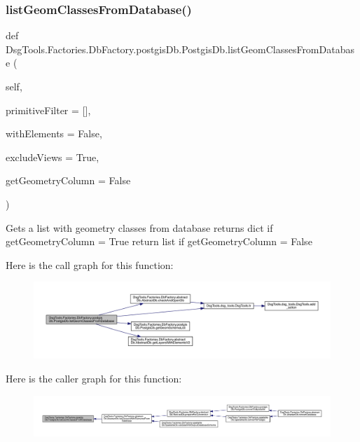 \subsubsection{\texorpdfstring{list\+Geom\+Classes\+From\+Database()}{listGeomClassesFromDatabase()}}
{\footnotesize\ttfamily def Dsg\+Tools.\+Factories.\+Db\+Factory.\+postgis\+Db.\+Postgis\+Db.\+list\+Geom\+Classes\+From\+Database (\begin{DoxyParamCaption}\item[{}]{self,  }\item[{}]{primitive\+Filter = {\ttfamily \mbox{[}\mbox{]}},  }\item[{}]{with\+Elements = {\ttfamily False},  }\item[{}]{exclude\+Views = {\ttfamily True},  }\item[{}]{get\+Geometry\+Column = {\ttfamily False} }\end{DoxyParamCaption})}

\begin{DoxyVerb}Gets a list with geometry classes from database
returns dict if getGeometryColumn = True
return list if getGeometryColumn = False
\end{DoxyVerb}
 Here is the call graph for this function\+:
\nopagebreak
\begin{figure}[H]
\begin{center}
\leavevmode
\includegraphics[width=350pt]{class_dsg_tools_1_1_factories_1_1_db_factory_1_1postgis_db_1_1_postgis_db_ac8bbdfcec0f449e4f45fff3392a8446b_cgraph}
\end{center}
\end{figure}
Here is the caller graph for this function\+:
\nopagebreak
\begin{figure}[H]
\begin{center}
\leavevmode
\includegraphics[width=350pt]{class_dsg_tools_1_1_factories_1_1_db_factory_1_1postgis_db_1_1_postgis_db_ac8bbdfcec0f449e4f45fff3392a8446b_icgraph}
\end{center}
\end{figure}
\mbox{\label{class_dsg_tools_1_1_factories_1_1_db_factory_1_1postgis_db_1_1_postgis_db_aa4e032bd36092305d6c45568404ee552}} 
